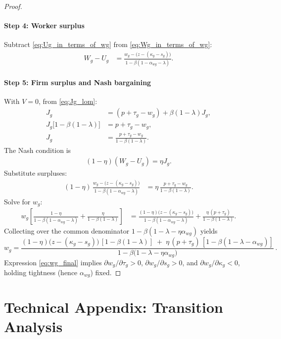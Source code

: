 \documentclass[preprint,12pt]{elsarticle}
\begin{document}
\begin{proof}
\paragraph{Step 4: Worker surplus}
Subtract \eqref{eq:Ug_in_terms_of_wg} from \eqref{eq:Wg_in_terms_of_wg}:
\begin{align}
W_g-U_g
&= \frac{w_g - \big(z-(\kappa_g-s_g)\big)}{1-\beta(1-\alpha_{wg}-\lambda)}.
\end{align}

\paragraph{Step 5: Firm surplus and Nash bargaining}
With \(V=0\), from \eqref{eq:Jg_lom}:
\begin{align}
J_g &= (p+\tau_g-w_g) + \beta(1-\lambda)J_g,\\
J_g\big[1-\beta(1-\lambda)\big] &= p+\tau_g-w_g,\\
J_g &= \frac{p+\tau_g-w_g}{1-\beta(1-\lambda)}.
\end{align}
The Nash condition is
\begin{align}
(1-\eta)(W_g-U_g) = \eta J_g.
\end{align}
Substitute surpluses:
\begin{align}
(1-\eta)\,\frac{w_g - \big(z-(\kappa_g-s_g)\big)}{1-\beta(1-\alpha_{wg}-\lambda)}
&=
\eta\,\frac{p+\tau_g-w_g}{1-\beta(1-\lambda)}.
\end{align}
Solve for \(w_g\):
\begin{align}
w_g\left[
\frac{1-\eta}{1-\beta(1-\alpha_{wg}-\lambda)}
+ \frac{\eta}{1-\beta(1-\lambda)}
\right]
&=
\frac{(1-\eta)\big(z-(\kappa_g-s_g)\big)}{1-\beta(1-\alpha_{wg}-\lambda)}
+
\frac{\eta\,(p+\tau_g)}{1-\beta(1-\lambda)}.
\end{align}
Collecting over the common denominator \(1-\beta(1-\lambda-\eta\alpha_{wg})\) yields
\begin{equation}
\boxed{
w_g
=
\frac{(1-\eta)\big(z-(\kappa_g-s_g)\big)\,[1-\beta(1-\lambda)]
\;+\;
\eta\,(p+\tau_g)\,[1-\beta(1-\lambda-\alpha_{wg})]}
{1-\beta\big(1-\lambda-\eta\alpha_{wg}\big)}\,.
}
\label{eq:wg_final}
\end{equation}
Expression \eqref{eq:wg_final} implies \(\partial w_g/\partial\tau_g>0\), \(\partial w_g/\partial s_g>0\), and \(\partial w_g/\partial \kappa_g<0\), holding tightness (hence \(\alpha_{wg}\)) fixed.
\end{proof}
\section{Technical Appendix: Transition Analysis}
\label{sec:appendix_transition}
\end{document}
